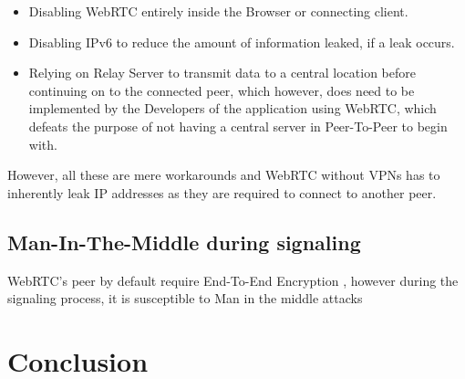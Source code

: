 \documentclass[conference]{IEEEtran}
\begin{document}
\begin{itemize}
    \item Disabling WebRTC entirely inside the Browser or connecting client.
    \item Disabling IPv6 to reduce the amount of information leaked, if a leak occurs.
    \item Relying on Relay Server to transmit data to a central location before continuing on to the connected peer,
    which however, does need to be implemented by the Developers of the application using WebRTC, which defeats the
    purpose of not having a central server in Peer-To-Peer to begin with.
\end{itemize}\cite{One_leak_will_sink_a_ship}
However, all these are mere workarounds and WebRTC without VPNs has to inherently leak
IP addresses as they are required to connect to another peer.

\subsection{Man-In-The-Middle during signaling}
WebRTC's peer by default require End-To-End Encryption \cite{RFC8827}, however during the signaling process,
it is susceptible to Man in the middle attacks \cite{Security_Mechanisms_for_Signaling}

\section{Conclusion}

\printbibliography{}
\end{document}
